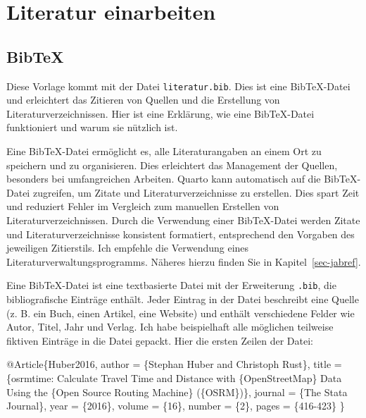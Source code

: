 \documentclass[
  stu,
  floatsintext,
  longtable,
  a4paper,
  nolmodern,
  notxfonts,
  notimes,
  donotrepeattitle,
  colorlinks=true,linkcolor=blue,citecolor=blue,urlcolor=blue]{apa7}
\newenvironment{Shaded}{\begin{snugshade}}{\end{snugshade}}
\newcommand{\NormalTok}[1]{\textcolor[rgb]{0.00,0.23,0.31}{#1}}
\begin{document}
\section{Literatur einarbeiten}\label{literatur-einarbeiten}

\subsection{BibTeX}\label{bibtex}

Diese Vorlage kommt mit der Datei \texttt{literatur.bib}. Dies ist eine
BibTeX-Datei und erleichtert das Zitieren von Quellen und die Erstellung
von Literaturverzeichnissen. Hier ist eine Erklärung, wie eine
BibTeX-Datei funktioniert und warum sie nützlich ist.

Eine BibTeX-Datei ermöglicht es, alle Literaturangaben an einem Ort zu
speichern und zu organisieren. Dies erleichtert das Management der
Quellen, besonders bei umfangreichen Arbeiten. Quarto kann automatisch
auf die BibTeX-Datei zugreifen, um Zitate und Literaturverzeichnisse zu
erstellen. Dies spart Zeit und reduziert Fehler im Vergleich zum
manuellen Erstellen von Literaturverzeichnissen. Durch die Verwendung
einer BibTeX-Datei werden Zitate und Literaturverzeichnisse konsistent
formatiert, entsprechend den Vorgaben des jeweiligen Zitierstils. Ich
empfehle die Verwendung eines Literaturverwaltungsprogramms. Näheres
hierzu finden Sie in Kapitel~\ref{sec-jabref}.

Eine BibTeX-Datei ist eine textbasierte Datei mit der Erweiterung
\texttt{.bib}, die bibliografische Einträge enthält. Jeder Eintrag in
der Datei beschreibt eine Quelle (z. B. ein Buch, einen Artikel, eine
Website) und enthält verschiedene Felder wie Autor, Titel, Jahr und
Verlag. Ich habe beispielhaft alle möglichen teilweise fiktiven Einträge
in die Datei gepackt. Hier die ersten Zeilen der Datei:

\begin{Shaded}
\begin{Highlighting}[]
\NormalTok{@Article\{Huber2016,}
\NormalTok{  author    = \{Stephan Huber and Christoph Rust\},}
\NormalTok{  title     = \{osrmtime: Calculate Travel Time and Distance with \{OpenStreetMap\} Data Using the \{Open Source Routing Machine\} (\{OSRM\})\},}
\NormalTok{  journal   = \{The Stata Journal\},}
\NormalTok{  year      = \{2016\},}
\NormalTok{  volume    = \{16\},}
\NormalTok{  number    = \{2\},}
\NormalTok{  pages     = \{416{-}423\}}
\NormalTok{\}}
\end{Highlighting}
\end{Shaded}
\end{document}
